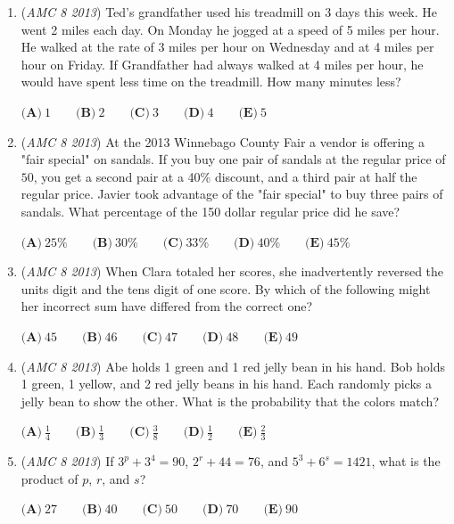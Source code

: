 \begin{enumerate}
	\item (\textit{AMC 8 2013}) Ted's grandfather used his treadmill on 3 days this week. He went 2 miles each day. On Monday he jogged at a speed of 5 miles per hour. He walked at the rate of 3 miles per hour on Wednesday and at 4 miles per hour on Friday. If Grandfather had always walked at 4 miles per hour, he would have spent less time on the treadmill. How many minutes less?


 $\textbf{(A)}\ 1 \qquad \textbf{(B)}\ 2 \qquad \textbf{(C)}\ 3 \qquad \textbf{(D)}\ 4 \qquad \textbf{(E)}\ 5$


	\item (\textit{AMC 8 2013}) At the 2013 Winnebago County Fair a vendor is offering a "fair special" on sandals. If you buy one pair of sandals at the regular price of $50$, you get a second pair at a 40\% discount, and a third pair at half the regular price. Javier took advantage of the "fair special" to buy three pairs of sandals. What percentage of the 150 dollar regular price did he save?


 $\textbf{(A)}\ 25\% \qquad \textbf{(B)}\ 30\% \qquad \textbf{(C)}\ 33\% \qquad \textbf{(D)}\ 40\% \qquad \textbf{(E)}\ 45\%$


	\item (\textit{AMC 8 2013}) When Clara totaled her scores, she inadvertently reversed the units digit and the tens digit of one score. By which of the following might her incorrect sum have differed from the correct one?


 $\textbf{(A)}\ 45 \qquad \textbf{(B)}\ 46 \qquad \textbf{(C)}\ 47 \qquad \textbf{(D)}\ 48 \qquad \textbf{(E)}\ 49$


	\item (\textit{AMC 8 2013}) Abe holds 1 green and 1 red jelly bean in his hand. Bob holds 1 green, 1 yellow, and 2 red jelly beans in his hand. Each randomly picks a jelly bean to show the other. What is the probability that the colors match?


 $\textbf{(A)}\ \frac14 \qquad \textbf{(B)}\ \frac13 \qquad \textbf{(C)}\ \frac38 \qquad \textbf{(D)}\ \frac12 \qquad \textbf{(E)}\ \frac23$


	\item (\textit{AMC 8 2013}) If $3^p + 3^4 = 90$, $2^r + 44 = 76$, and $5^3 + 6^s = 1421$, what is the product of $p$, $r$, and $s$?


 $\textbf{(A)}\ 27 \qquad \textbf{(B)}\ 40 \qquad \textbf{(C)}\ 50 \qquad \textbf{(D)}\ 70 \qquad \textbf{(E)}\ 90$



\end{enumerate}
